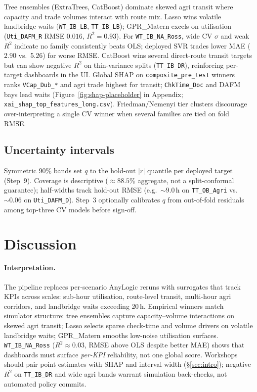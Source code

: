 \documentclass[12pt,twocolumn,a4paper]{article}
\theoremstyle{plain}
\theoremstyle{definition}
\theoremstyle{remark}
\begin{document}
Tree ensembles (ExtraTrees, CatBoost) dominate skewed agri transit where capacity and trade volumes interact with route mix.
Lasso wins volatile landbridge waits (\texttt{WT\_IB\_LB}, \texttt{TT\_IB\_LB}); GPR\_Matern excels on utilisation (\texttt{Uti\_DAFM\_R} RMSE $0.016$, $R^2{=}0.93$).
For \texttt{WT\_IB\_NA\_Ross}, wide CV $\sigma$ and weak $R^2$ indicate no family consistently beats OLS; deployed SVR trades lower MAE ($2.90$ vs.\ $5.26$) for worse RMSE.
CatBoost wins several direct-route transit targets but can show negative $R^2$ on thin-variance splits (\texttt{TT\_IB\_DR}), reinforcing per-target dashboards in the UI.
Global SHAP on \texttt{composite\_pre\_test} winners ranks \texttt{VCap\_Dub\_*} and agri trade highest for transit; \texttt{ChkTime\_Doc} and DAFM bays lead waits (Figure~\ref{fig:shap-placeholder} in Appendix; \texttt{xai\_shap\_top\_features\_long.csv}).
Friedman/Nemenyi tier clusters discourage over-interpreting a single CV winner when several families are tied on fold RMSE.

\subsection{Uncertainty intervals}
\label{sec:results-intervals}

Symmetric 90\% bands set $q$ to the hold-out $|r|$ quantile per deployed target (Step~9).
Coverage is descriptive (${\approx}88.5\%$ aggregate, not a split-conformal guarantee); half-widths track hold-out RMSE (e.g.\ ${\sim}9.0$\,h on \texttt{TT\_OB\_Agri} vs.\ ${\sim}0.06$ on \texttt{Uti\_DAFM\_D}).
Step~3 optionally calibrates $q$ from out-of-fold residuals among top-three CV models before sign-off.

\section{Discussion}
\label{sec:discussion}

\paragraph{Interpretation.}
The pipeline replaces per-scenario AnyLogic reruns with surrogates that track KPIs across scales: sub-hour utilisation, route-level transit, multi-hour agri corridors, and landbridge waits exceeding 20\,h.
Empirical winners match simulator structure: tree ensembles capture capacity--volume interactions on skewed agri transit; Lasso selects sparse check-time and volume drivers on volatile landbridge waits; GPR\_Matern smooths low-noise utilisation surfaces.
\texttt{WT\_IB\_NA\_Ross} ($R^2{\approx}0.03$, RMSE above OLS despite better MAE) shows that dashboards must surface \emph{per-KPI} reliability, not one global score.
Workshops should pair point estimates with SHAP and interval width (\S\ref{sec:intro}); negative $R^2$ on \texttt{TT\_IB\_DR} and wide agri bands warrant simulation back-checks, not automated policy commits.
\end{document}
